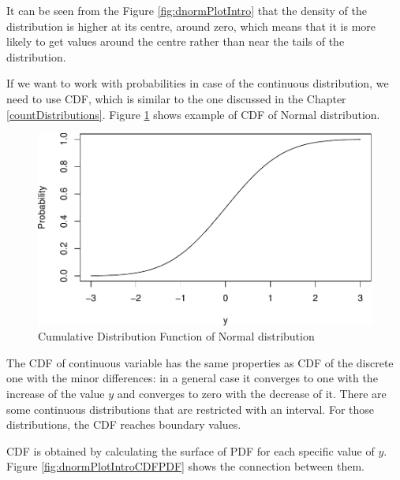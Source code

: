 \documentclass[
]{book}
\theoremstyle{definition}
\theoremstyle{definition}
\theoremstyle{definition}
\theoremstyle{definition}
\theoremstyle{remark}
\begin{document}
It can be seen from the Figure \ref{fig:dnormPlotIntro} that the density of the distribution is higher at its centre, around zero, which means that it is more likely to get values around the centre rather than near the tails of the distribution.

If we want to work with probabilities in case of the continuous distribution, we need to use CDF, which is similar to the one discussed in the Chapter \ref{countDistributions}. Figure \ref{fig:dnormPlotIntroCDF} shows example of CDF of Normal distribution.

\begin{figure}
\centering
\includegraphics{Svetunkov---Statistics-for-Business-Analytics_files/figure-latex/dnormPlotIntroCDF-1.pdf}
\caption{\label{fig:dnormPlotIntroCDF}Cumulative Distribution Function of Normal distribution}
\end{figure}

The CDF of continuous variable has the same properties as CDF of the discrete one with the minor differences: in a general case it converges to one with the increase of the value \(y\) and converges to zero with the decrease of it. There are some continuous distributions that are restricted with an interval. For those distributions, the CDF reaches boundary values.

CDF is obtained by calculating the surface of PDF for each specific value of \(y\). Figure \ref{fig:dnormPlotIntroCDFPDF} shows the connection between them.
\end{document}
